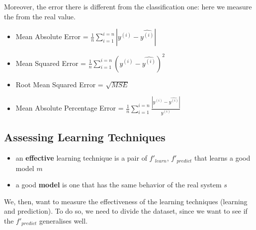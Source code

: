 Moreover, the error there is different from the classification one: here we measure the  from the real value.

\begin{itemize}
    \item {} Mean Absolute Error = $\frac{1}{n}\sum_{i=1}^{i=n}|y^{(i)} - \hat{y^{(i)}}|$
    \item {} Mean Squared Error = $\frac{1}{n}\sum_{i=1}^{i=n}(y^{(i)} - \hat{y^{(i)}})^2$   
    \item {} Root Mean Squared Error = $\sqrt{MSE}$
    \item {} Mean Absolute Percentage Error = $\frac{1}{n}\sum_{i=1}^{i=n}\frac{|y^{(i)} - \hat{y^{(i)}}|}{y^{(i)}}$
\end{itemize}

\subsection{Assessing Learning Techniques}
\begin{itemize}
    \item an \textbf{effective} learning technique is a pair of $f'_{learn}$, $f'_{predict}$ that learns a good model $m$
    \item a good \textbf{model} is one that has the same behavior of the real system $s$
\end{itemize}

We, then, want to measure the effectiveness of the learning techniques (learning and prediction).
To do so, we need to divide the dataset, since we want to see if the $f'_{predict}$ generalises well.



